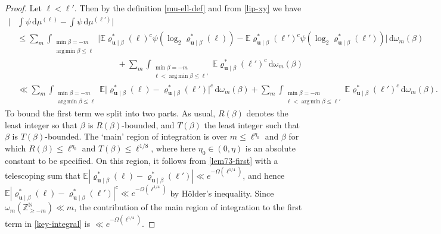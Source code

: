 \documentclass[11pt,reqno]{amsart}
\DeclareMathOperator*{\argmin}{arg\,min}
\numberwithin{equation}{section}
\theoremstyle{definition}
\theoremstyle{remark}
\newcommand{\mb}{\mathbb}
\newcommand{\mbf}{\mathbf}
\renewcommand{\le}{\leqslant}
\renewcommand{\ge}{\geqslant}
\newcommand\Z{\mathbb{Z}}
\newcommand\N{\mathbb{N}}
\begin{document}
\begin{proof}
Let $\ell < \ell'$. Then by the definition \cref{mu-ell-def} and from \cref{lip-xy} we have
\begin{align}\nonumber\big| & \int \psi \, \mathrm{d}\mu^{(\ell)} - \int \psi \, \mathrm{d}\mu^{(\ell')} \big| \\\nonumber & \le \sum_m \int_{\substack{\min \beta = -m \\ \argmin \beta \le \ell}}\Big|  \mb{E} \varrho^*_{\mbf{u} \mid \beta}(\ell)^c \psi (\log_2 \varrho^*_{\mbf{u} \mid \beta}(\ell)) -  \mb{E} \varrho^*_{\mbf{u} \mid \beta}(\ell')^c \psi (\log_2 \varrho^*_{\mbf{u} \mid \beta}(\ell')) \Big| \, \mathrm{d}\omega_m(\beta) \\ \nonumber & \qquad\qquad\qquad\qquad\qquad\qquad + \sum_{m}\int_{\substack{\min \beta = -m \\ \ell < \argmin \beta \le \ell'}} \mb{E}\varrho^*_{\mbf{u} \mid \beta}(\ell')^c \, \mathrm{d}\omega_m(\beta)\\  
& \ll \sum_m \int_{\substack{\min \beta = -m \\ \argmin \beta \le \ell}}  \mb{E} \big|\varrho^*_{\mbf{u} \mid \beta}(\ell) -  \varrho^*_{\mbf{u} \mid \beta}(\ell')\big|^c \, \mathrm{d}\omega_m(\beta) + \sum_{m}\int_{\substack{\min \beta = -m \\ \ell < \argmin \beta \le \ell'}} \mb{E}\varrho^*_{\mbf{u} \mid \beta}(\ell')^c \, \mathrm{d}\omega_m(\beta).\label{key-integral}
\end{align}
To bound the first term we split into two parts. As usual, $R(\beta)$ denotes the least integer so that $\beta$ is $R(\beta)$-bounded, and $T(\beta)$ the least integer such that $\beta$ is $T(\beta)$-bounded. The `main' region of integration is over $m \le \ell^{\eta_0}$ and $\beta$ for which $R(\beta) \le \ell^{\eta_0}$ and $T(\beta) \le \ell^{1/8}$, where here $\eta_0\in (0,\eta)$ is an absolute constant to be specified. On this region, it follows from \cref{lem73-first} with a telescoping sum that $\mb{E} |\varrho^*_{\mbf{u} \mid \beta}(\ell) - \varrho^*_{\mbf{u} \mid \beta}(\ell')| \ll e^{-\Omega(\ell^{1/4})}$, and hence $\mb{E} |\varrho^*_{\mbf{u} \mid \beta}(\ell) - \varrho^*_{\mbf{u} \mid \beta}(\ell')|^c \ll e^{-\Omega(\ell^{1/4})}$ by H\"older's inequality. Since $\omega_m (\Z^{\N}_{\ge -m}) \ll m$, the contribution of the main region of integration to the first term in \cref{key-integral} is $\ll e^{-\Omega(\ell^{1/4})}$.


\end{proof}
\end{document}
